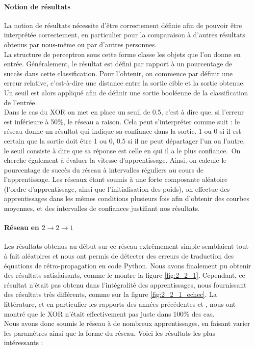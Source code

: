 \paragraph{Notion de résultats} %
\label{par:notion_de_resultats}
La notion de résultats nécessite d'être correctement définie afin de pouvoir être interprétée correctement, en particulier pour la comparaison à d'autres résultats obtenus par nous-même ou par d'autres personnes. \\
La structure de perceptron sous cette forme classe les objets que l'on donne en entrée. Généralement, le résultat est défini par rapport à un pourcentage de succès dans cette classification. Pour l'obtenir, on commence par définir une erreur relative, c'est-à-dire une distance entre la sortie cible et la sortie obtenue. Un seuil est alors appliqué afin de définir une sortie booléenne de la classification de l'entrée.\\
Dans le cas du XOR on met en place un seuil de 0.5, c'est à dire que, si l'erreur est inférieure à 50\%, le réseau a raison. Cela peut s’interpréter comme suit : le réseau donne un résultat qui indique sa confiance dans la sortie. 1 ou 0 si il est certain que la sortie doit être 1 ou 0, 0.5 si il ne peut départager l'un ou l'autre, le seuil consiste à dire que sa réponse est celle en qui il a le plus confiance.\
On cherche également à évaluer la vitesse d'apprentissage. Ainsi, on calcule le pourcentage de succès du réseau à intervalles réguliers au cours de l'apprentissage. Les réseaux étant soumis à une forte composante aléatoire (l'ordre d'apprentissage, ainsi que l'initialisation des poids), on effectue des apprentissages dans les mêmes conditions plusieurs fois afin d'obtenir des courbes moyennes, et des intervalles de confiances justifiant nos résultats.

\paragraph{Réseau en $2\rightarrow2\rightarrow1$} %

Les résultats obtenus au début sur ce réseau extrêmement simple semblaient tout à fait aléatoires et nous ont permis de détecter des erreurs de traduction des équations de rétro-propagation en code Python. Nous avons finalement pu obtenir des résultats satisfaisants, comme le montre la figure \ref{fig:2_2_1}. Cependant, ce résultat n'était pas obtenu dans l'intégralité des apprentissages, nous fournissant des résultats très différents, comme sur la figure \ref{fig:2_2_1_echec}. La littérature, et en particulier les rapports des années précédentes \cite{appartement} et \cite{Pinaple}, nous ont montré que le XOR n'était effectivement pas juste dans 100\% des cas.\\
Nous avons donc soumis le réseau à de nombreux apprentissages, en faisant varier les paramètres ainsi que la forme du réseau. Voici les résultats les plus intéressants :


